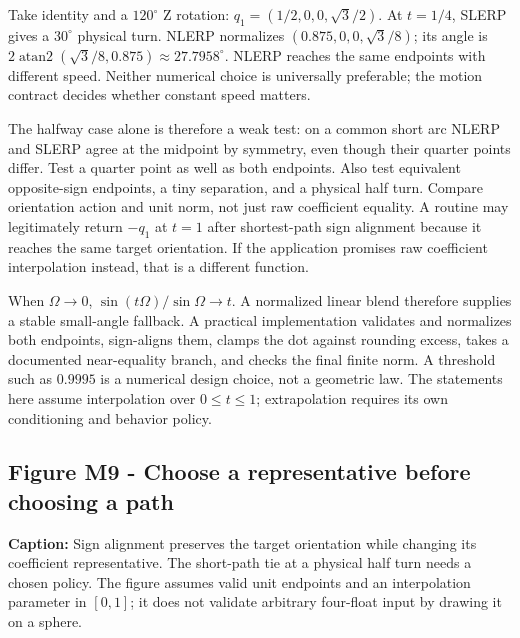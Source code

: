 Take identity and a \(120^\circ\) Z rotation: \(q_1=(1/2,0,0,\sqrt3/2)\). At \(t=1/4\), SLERP gives a \(30^\circ\) physical turn. NLERP normalizes \((0.875,0,0,\sqrt3/8)\); its angle is \(2\operatorname{atan2}(\sqrt3/8,0.875)\approx27.7958^\circ\). NLERP reaches the same endpoints with different speed. Neither numerical choice is universally preferable; the motion contract decides whether constant speed matters.

The halfway case alone is therefore a weak test: on a common short arc NLERP and SLERP agree at the midpoint by symmetry, even though their quarter points differ. Test a quarter point as well as both endpoints. Also test equivalent opposite-sign endpoints, a tiny separation, and a physical half turn. Compare orientation action and unit norm, not just raw coefficient equality. A routine may legitimately return \(-q_1\) at \(t=1\) after shortest-path sign alignment because it reaches the same target orientation. If the application promises raw coefficient interpolation instead, that is a different function.

When \(\Omega\to0\), \(\sin(t\Omega)/\sin\Omega\to t\). A normalized linear blend therefore supplies a stable small-angle fallback. A practical implementation validates and normalizes both endpoints, sign-aligns them, clamps the dot against rounding excess, takes a documented near-equality branch, and checks the final finite norm. A threshold such as \(0.9995\) is a numerical design choice, not a geometric law. The statements here assume interpolation over \(0\le t\le1\); extrapolation requires its own conditioning and behavior policy.

\subsection{Figure M9 - Choose a representative before choosing a path}\label{01-foundations-i-ch019-figure-m9---choose-a-representative-before-choosing-a-path}

\hypertarget{01-foundations-i-ch019-figure-m9---choose-a-representative-before-choosing-a-path}{}


\textbf{Caption:} Sign alignment preserves the target orientation while changing its coefficient representative. The short-path tie at a physical half turn needs a chosen policy. The figure assumes valid unit endpoints and an interpolation parameter in \([0,1]\); it does not validate arbitrary four-float input by drawing it on a sphere.

